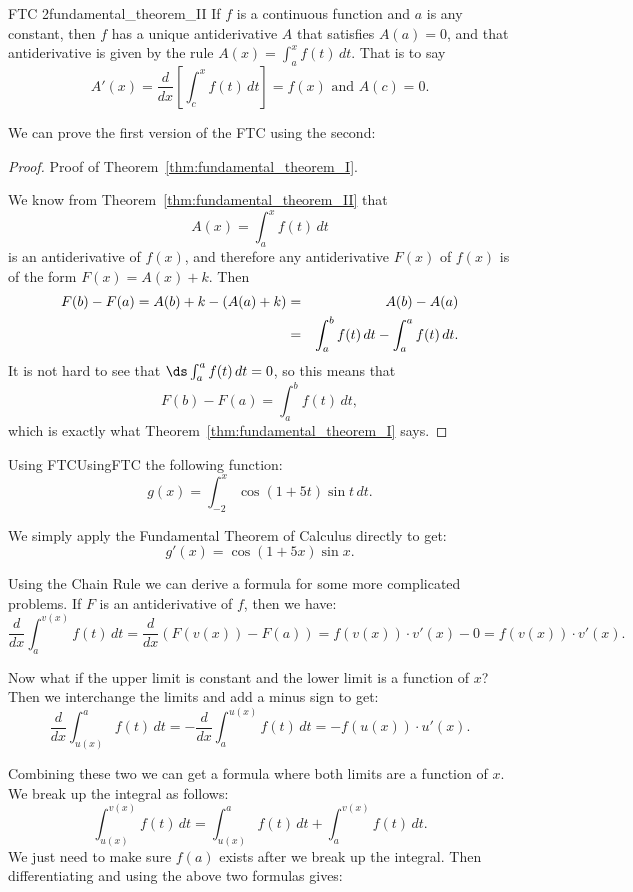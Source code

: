 \begin{theorem}{FTC 2}{fundamental_theorem_II} 
If $f$ is a continuous function and $a$ is any constant, then $f$ has a unique antiderivative $A$ that satisfies $A(a) = 0$, and that antiderivative is given by the rule $A(x) = \int_a^x f(t) \, dt$. That is to say
\[
A'(x) = \frac{d}{dx}\left[\int_c^x f(t) \, dt\right]= f(x) \text{ and } A(c)=0.
\]
\end{theorem}

We can prove the first version of the FTC using the second:

\begin{proof} Proof of Theorem~\ref{thm:fundamental_theorem_I}.

We know from Theorem~\ref{thm:fundamental_theorem_II} that 
$$
  A(x)=\int_a^x f(t)\,dt
$$
is an antiderivative of $f(x)$, and therefore any antiderivative
$F(x)$ of $f(x)$ is of the form $F(x)=A(x)+k$. Then 
\begin{eqnarray*}
  F(b)-F(a)=A(b)+k-(A(a)+k) &=& A(b)-A(a)\cr
  &=&\int_a^b f(t)\,dt-\int_a^a f(t)\,dt.\cr
\end{eqnarray*}
It is not hard to see that $\ds \int_a^a f(t)\,dt=0$, so this means that
$$
  F(b)-F(a)=\int_a^b f(t)\,dt,
$$
which is exactly what Theorem~\ref{thm:fundamental_theorem_I} says.
\end{proof}

\begin{example}{Using FTC}{UsingFTC}
 the following function:
$$g(x)=\int_{-2}^x \cos(1+5t)\sin t\,dt.$$
\end{example}

\begin{solution} 
We simply apply the Fundamental Theorem of Calculus directly to get:
$$g'(x)=\cos(1+5x)\sin x.$$
\end{solution}

Using the Chain Rule we can derive a formula for some more complicated problems.
If $ F$ is an antiderivative of $ f $, then we have:
$$\frac{d}{dx}\int_a^{v(x)}f(t)\,dt=\frac{d}{dx}\left(F(v(x))-F(a)\right) =f(v(x))\cdot v'(x) - 0=f(v(x))\cdot v'(x).$$

Now what if the upper limit is constant and the lower limit is a function of $x$?
Then we interchange the limits and add a minus sign to get:
$$\frac{d}{dx}\int_{u(x)}^af(t)\,dt=-\frac{d}{dx}\int_a^{u(x)} f(t)\,dt=-f(u(x))\cdot u'(x).$$

Combining these two we can get a formula where both limits are a function of $x$.
We break up the integral as follows:
$$\int_{u(x)}^{v(x)} f(t)\,dt=\int_{u(x)}^a f(t)\,dt+\int_a^{v(x)}f(t)\,dt.$$
We just need to make sure $f(a)$ exists after we break up the integral.
Then differentiating and using the above two formulas gives:

